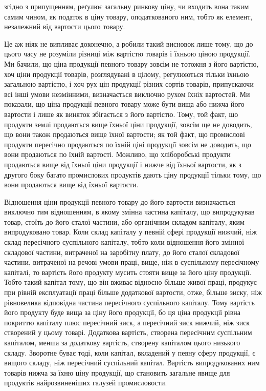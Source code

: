 \parcont{}  %
згідно з припущенням, реґулює загальну ринкову ціну, чи входить вона таким самим чином, як податок в
ціну товару, оподаткованого ним, тобто як елемент, незалежний від вартости цього товару.

Це аж ніяк не випливає доконечно, а робили такий висновок лише тому,
що до цього часу не розуміли різниці між вартістю товарів і їхньою ціною
продукції. Ми бачили, що ціна продукції певного товару зовсім не тотожня
з його вартістю, хоч ціни продукції товарів, розглядувані в цілому, регулюються
тільки їхньою загальною вартістю, і хоч рух цін продукції різних сортів
товарів, припускаючи всі інші умови незмінними, визначається виключно
рухом їхніх вартостей. Ми показали, що ціна продукції певного товару може
бути вища або нижча його вартости і лише як виняток збігається з його вартістю.
Тому, той факт, що продукти землі продаються вище їхньої ціни продукції,
зовсім ще не доводить, що вони також продаються вище їхної вартости; як той факт, що промислові
продукти пересічно продаються по їхній ціні продукції зовсім не доводить, що вони продаються по
їхній вартості. Можливо, що хліборобські продукти продаються вище від їхньої ціни продукції і нижче
від їхньої вартости, як з другого боку багато промислових продуктів дають ціну продукції тільки
тому, що вони продаються вище від їхньої вартости.

Відношення ціни продукції певного товару до його вартости визначається
виключно тим відношенням, в якому змінна частина капіталу, що випродукував товар, стоїть до його
сталої частини, або органічним складом капіталу, яким випродуковано товар. Коли склад капіталу у
певній сфері продукції нижчий, ніж склад пересічного суспільного капіталу, тобто коли відношення
його змінної складової частини, витраченої на заробітну плату, до його сталої складової частини,
витраченої на речові умови праці, вище, ніж в суспільному пересічному капіталі, то вартість його
продукту мусить стояти вище за його ціну продукції. Тобто такий капітал тому, що він вживає відносно
більше живої праці, продукує при рівній експлуатації праці більше додаткової вартости, отже, більше
зиску, ніж рівновелика відповідна частина пересічного суспільного капіталу. Тому вартість його
продукту буде вища за ціну його продукції, бо ця ціна продукції рівна покриттю капіталу плюс
пересічний зиск, а пересічний зиск нижчий, ніж зиск створений у цьому товарі. Додаткова вартість,
створена пересічним суспільним капіталом, менша за додаткову вартість, створену капіталом цього
низького складу. Зворотне буває тоді, коли капітал, вкладений у певну сферу продукції, є вищого
складу, ніж пересічний суспільний капітал. Вартість випродукованих ним товарів нижча за їхню ціну
продукції, що становить загальне явище для продуктів найрозвиненіших галузей промисловости.

